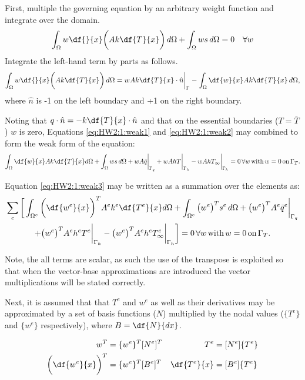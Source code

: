First, multiple the governing equation by an arbitrary weight function and integrate over the domain.
\begin{equation}\label{eq:HW2:1:weak1}
\int_{\Omega} w \df{}{x}\bigg({Ak \df{T}{x}}\bigg) \, d\Omega + \int_{\Omega} w s \, d\Omega = 0  \quad \forall w
\end{equation}
Integrate the left-hand term by parts as follows.
\begin{equation}\label{eq:HW2:1:weak2}
\int_{\Omega} w \df{}{x}\bigg({Ak \df{T}{x}}\bigg) \, d\Omega = wAk\df{T}{x}\cdot \hat{n}\bigg|_\Gamma - \int_{\Omega} \df{w}{x} Ak \df{T}{x} \, d\Omega,
\end{equation}
where $\hat{n}$ is -1 on the left boundary and +1 on the right boundary.

Noting that $q\cdot\hat{n} = -k\df{T}{x}\cdot\hat{n}$ and that on the essential boundaries ($T = \bar{T}$) $w$ is zero,
Equations \eqref{eq:HW2:1:weak1} and \eqref{eq:HW2:1:weak2} may combined to form the weak form of the equation:
\begin{equation}\label{eq:HW2:1:weak3}
\int_{\Omega} \df{w}{x} Ak \df{T}{x} d\Omega + \int_{\Omega} w s \, d\Omega + wA\bar{q}\bigg|_{\Gamma_q} + wAhT\bigg|_{\Gamma_h} - wAhT_{\infty}\bigg|_{\Gamma_h} = 0  \, \forall w \, \text{with} \, w=0 \, \text{on} \, \Gamma_T.
\end{equation}

Equation \eqref{eq:HW2:1:weak3} may be written as a summation over the elements as:
\begin{multline}\label{eq:HW2:1:fe1}
\sum_e \bigg[\int_{\Omega^e} \bigg(\df{w^e}{x}\bigg)^T A^e k^e \df{T^e}{x} d\Omega 
+ \int_{\Omega^e} \big(w^e\big)^T s^e \, d\Omega 
+ \big(w^e\big)^T A^e \bar{q}^e \bigg|_{\Gamma_q} \\
+ \big(w^e\big)^T A^e h^e T^e \bigg|_{\Gamma_h} 
- \big(w^e\big)^T A^e h^e T^e_{\infty} \bigg|_{\Gamma_h} \bigg] = 0  \, \forall w \, \text{with} \, w=0 \, \text{on} \, \Gamma_T.
\end{multline}

Note, the all terms are scalar, as such the use of the transpose is exploited so that when the vector-base approximations are introduced the vector multiplications will be stated correctly.

Next, it is assumed that that $T^e$ and $w^e$ as well as their derivatives may be approximated by a set of basis functions ($N$) multiplied by the nodal values ($\{T^e\}$ and $\{w^e\}$ respectively), where $B = \df{N}{dx}$.

\begin{align*}
w^T &= \{w^e\}^T [ N^e ]^T & T^e &= [ N^e ] \{T^e\} \\
\bigg(\df{w^e}{x}\bigg)^T &= \{w^e\}^T  [ B^e ]^T &\df{T^e}{x} &= [ B^e ] \{T^e\}
\end{align*}

